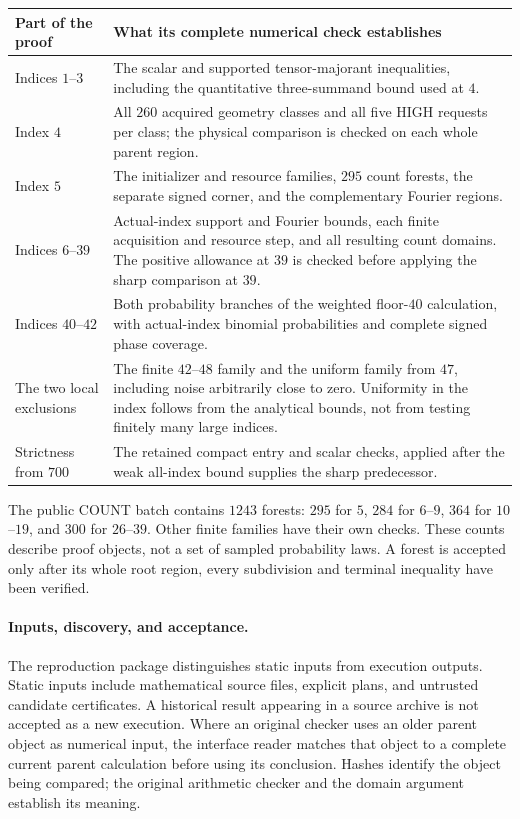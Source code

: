 \begin{center}\small
\begin{tabular}{@{}P{.17\linewidth}P{.76\linewidth}@{}}
\toprule
Part of the proof & What its complete numerical check establishes \\
\midrule
Indices $1$--$3$ & The scalar and supported tensor-majorant inequalities,
including the quantitative three-summand bound used at $4$. \\
Index $4$ & All $260$ acquired geometry classes and all five HIGH requests
per class; the physical comparison is checked on each whole parent region. \\
Index $5$ & The initializer and resource families, $295$ count forests,
the separate signed corner, and the complementary Fourier regions. \\
Indices $6$--$39$ & Actual-index support and Fourier bounds, each finite
acquisition and resource step, and all resulting count domains. The
positive allowance at $39$ is checked before applying the sharp comparison
at $39$. \\
Indices $40$--$42$ & Both probability branches of the weighted floor-$40$
calculation, with actual-index binomial probabilities and complete signed
phase coverage. \\
The two local exclusions & The finite $42$--$48$ family and the uniform
family from $47$, including noise arbitrarily close to zero. Uniformity in
the index follows from the analytical bounds, not from testing finitely many
large indices. \\
Strictness from $700$ & The retained compact entry and scalar checks,
applied after the weak all-index bound supplies the sharp predecessor. \\
\bottomrule
\end{tabular}
\end{center}

The public COUNT batch contains $1243$ forests: $295$ for $5$, $284$ for
$6$--$9$, $364$ for $10$--$19$, and $300$ for $26$--$39$. Other finite
families have their own checks. These counts describe proof objects, not a
set of sampled probability laws. A forest is accepted only after its whole
root region, every subdivision and terminal inequality have been verified.

\paragraph{Inputs, discovery, and acceptance.}
The reproduction package distinguishes static inputs from execution
outputs. Static inputs include mathematical source files, explicit plans,
and untrusted candidate certificates. A historical result appearing in a
source archive is not accepted as a new execution. Where an original
checker uses an older parent object as numerical input, the interface reader
matches that object to a complete current parent calculation before using
its conclusion. Hashes identify the object being compared; the original
arithmetic checker and the domain argument establish its meaning.

